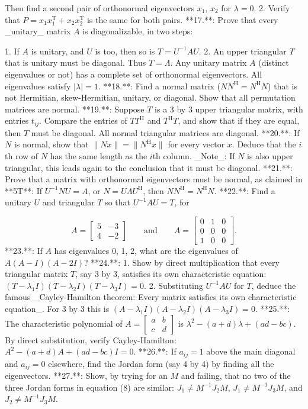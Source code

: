 Then find a second pair of orthonormal eigenvectors \(x_{1}\), \(x_{2}\) for \(\lambda=0\). 2. Verify that \(P=x_{1}x_{1}^{\mathrm{T}}+x_{2}x_{2}^{\mathrm{T}}\) is the same for both pairs.
**17.**: Prove that every _unitary_ matrix \(A\) is diagonalizable, in two steps:

1. If \(A\) is unitary, and \(U\) is too, then so is \(T=U^{-1}AU\). 2. An upper triangular \(T\) that is unitary must be diagonal. Thus \(T=\Lambda\). Any unitary matrix \(A\) (distinct eigenvalues or not) has a complete set of orthonormal eigenvectors. All eigenvalues satisfy \(|\lambda|=1\).
**18.**: Find a normal matrix (\(NN^{\mathrm{H}}=N^{\mathrm{H}}N\)) that is not Hermitian, skew-Hermitian, unitary, or diagonal. Show that all permutation matrices are normal.
**19.**: Suppose \(T\) is a 3 by 3 upper triangular matrix, with entries \(t_{ij}\). Compare the entries of \(TT^{\mathrm{H}}\) and \(T^{\mathrm{H}}T\), and show that if they are equal, then \(T\) must be diagonal. All normal triangular matrices are diagonal.
**20.**: If \(N\) is normal, show that \(\|Nx\|=\|N^{\mathrm{H}}x\|\) for every vector \(x\). Deduce that the \(i\)th row of \(N\) has the same length as the \(i\)th column. _Note_: If \(N\) is also upper triangular, this leads again to the conclusion that it must be diagonal.
**21.**: Prove that a matrix with orthonormal eigenvectors must be normal, as claimed in **5T**: If \(U^{-1}NU=A\), or \(N=U\Lambda U^{\mathrm{H}}\), then \(NN^{\mathrm{H}}=N^{\mathrm{H}}N\).
**22.**: Find a unitary \(U\) and triangular \(T\) so that \(U^{-1}AU=T\), for

\[A=\begin{bmatrix}5&-3\\ 4&-2\end{bmatrix}\qquad\text{and}\qquad A=\begin{bmatrix}0&1&0\\ 0&0&0\\ 1&0&0\end{bmatrix}.\]
**23.**: If \(A\) has eigenvalues 0, 1, 2, what are the eigenvalues of \(A(A-I)(A-2I)\)?
**24.**:
1. Show by direct multiplication that every triangular matrix \(T\), say 3 by 3, satisfies its own characteristic equation: \((T-\lambda_{1}I)(T-\lambda_{2}I)(T-\lambda_{3}I)=0\).
2. Substituting \(U^{-1}AU\) for \(T\), deduce the famous _Cayley-Hamilton theorem: Every matrix satisfies its own characteristic equation_. For 3 by 3 this is \((A-\lambda_{1}I)(A-\lambda_{2}I)(A-\lambda_{3}I)=0\).
**25.**: The characteristic polynomial of \(A=\begin{bmatrix}a&b\\ c&d\end{bmatrix}\) is \(\lambda^{2}-(a+d)\lambda+(ad-bc)\). By direct substitution, verify Cayley-Hamilton: \(A^{2}-(a+d)A+(ad-bc)I=0\).
**26.**: If \(a_{ij}=1\) above the main diagonal and \(a_{ij}=0\) elsewhere, find the Jordan form (say 4 by 4) by finding all the eigenvectors.
**27.**: Show, by trying for an \(M\) and failing, that no two of the three Jordan forms in equation (8) are similar: \(J_{1}\neq M^{-1}J_{2}M\), \(J_{1}\neq M^{-1}J_{3}M\), and \(J_{2}\neq M^{-1}J_{3}M\).

 